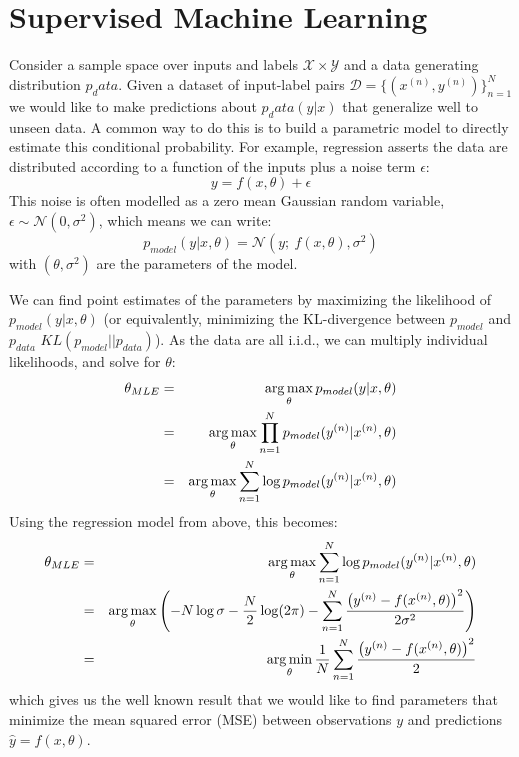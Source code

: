 \section{Supervised Machine Learning}
Consider a sample space over inputs and labels $\mathcal{X} \times \mathcal{Y}$
and a data generating distribution $p_data$. Given a dataset of input-label
pairs $\mathcal{D} = \{(x^{(n)}, y^{(n)})\}_{n=1}^N$ we would like to make
predictions about $p_data(y|x)$ that generalize well to unseen data. A common
way to do this is to build a parametric model to directly estimate this
conditional probability.  For example, regression asserts the data are
distributed according to a function of the inputs plus a noise term $\epsilon$:
\begin{equation}
  y = f(x, \theta) + \epsilon
\end{equation}
This noise is often modelled as a zero mean Gaussian random variable, $\epsilon
\sim \mathcal{N}(0, \sigma^2)$, which means we can write:
\begin{equation}\label{eq:ch2:regression}
  p_{model}(y|x, \theta) = \mathcal{N}(y;\ f(x, \theta), \sigma^2)
\end{equation}
with $(\theta, \sigma^2)$ are the parameters of the model. 

We can find point estimates of the parameters by maximizing the likelihood of
$p_{model}(y|x, \theta)$ (or equivalently, minimizing the KL-divergence between
$p_{model}$ and $p_{data}$ $KL(p_{model}||p_{data})$). As the data are all
i.i.d., we can multiply individual likelihoods, and solve for $\theta$:
\begin{eqnarray}
  \theta_{MLE} &=& \operatorname*{arg\,max}_{\theta} p_{model}(y|x, \theta) \\
              &=& \operatorname*{arg\,max}_{\theta} \prod_{n=1}^{N} p_{model}(y^{(n)}|x^{(n)}, \theta) \\
              &=& \operatorname*{arg\,max}_{\theta} \sum_{n=1}^N \log p_{model}(y^{(n)}|x^{(n)}, \theta)
\end{eqnarray}
Using the regression model from above, this becomes:
\begin{eqnarray} 
  \theta_{MLE} &=& \operatorname*{arg\,max}_{\theta} \sum_{n=1}^N \log p_{model}(y^{(n)}|x^{(n)}, \theta) \\
              &=& \operatorname*{arg\,max}_{\theta} \left(-N\log \sigma - \frac{N}{2}\log (2\pi) - \sum_{n=1}^{N}
                  \frac{\left(y^{(n)} - f(x^{(n)}, \theta)\right)^2}{2\sigma^2}\right) \\
  &=& \operatorname*{arg\,min}_{\theta}\frac{1}{N}\sum_{n=1}^{N} \frac{\left(y^{(n)} - f(x^{(n)}, \theta)\right)^2}{2}
\end{eqnarray}
which gives us the well known result that we would like to find parameters that
minimize the mean squared error (MSE) between observations $y$ and predictions
$\hat{y} = f(x, \theta)$.

